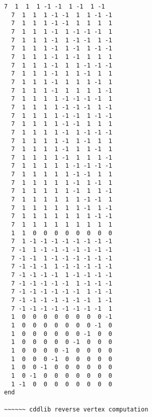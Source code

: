 \documentclass[%
  twocolumn,
 showpacs,
 showkeys,
 preprintnumbers,
 amsmath,amssymb,
 aps,
  pra,
  longbibliography,
 floatfix,
 ]{revtex4-1}
\begin{document}
{\begin{lstlisting}[backgroundcolor=\color{yellow!10},framerule=0pt,breaklines=true, frame=tb]
  7  1  1  1 -1 -1  1 -1  1 -1
  7  1  1  1 -1 -1  1  1 -1 -1
  7  1  1  1 -1 -1  1  1  1  1
  7  1  1  1 -1  1 -1 -1 -1  1
  7  1  1  1 -1  1 -1 -1  1 -1
  7  1  1  1 -1  1 -1  1 -1 -1
  7  1  1  1 -1  1 -1  1  1  1
  7  1  1  1 -1  1  1 -1 -1 -1
  7  1  1  1 -1  1  1 -1  1  1
  7  1  1  1 -1  1  1  1 -1  1
  7  1  1  1 -1  1  1  1  1 -1
  7  1  1  1  1 -1 -1 -1 -1  1
  7  1  1  1  1 -1 -1 -1  1 -1
  7  1  1  1  1 -1 -1  1 -1 -1
  7  1  1  1  1 -1 -1  1  1  1
  7  1  1  1  1 -1  1 -1 -1 -1
  7  1  1  1  1 -1  1 -1  1  1
  7  1  1  1  1 -1  1  1 -1  1
  7  1  1  1  1 -1  1  1  1 -1
  7  1  1  1  1  1 -1 -1 -1 -1
  7  1  1  1  1  1 -1 -1  1  1
  7  1  1  1  1  1 -1  1 -1  1
  7  1  1  1  1  1 -1  1  1 -1
  7  1  1  1  1  1  1 -1 -1  1
  7  1  1  1  1  1  1 -1  1 -1
  7  1  1  1  1  1  1  1 -1 -1
  7  1  1  1  1  1  1  1  1  1
  1  1  0  0  0  0  0  0  0  0
  7  1 -1 -1 -1 -1 -1 -1 -1 -1
  7 -1  1 -1 -1 -1 -1 -1 -1 -1
  7 -1 -1  1 -1 -1 -1 -1 -1 -1
  7 -1 -1 -1  1 -1 -1 -1 -1 -1
  7 -1 -1 -1 -1  1 -1 -1 -1 -1
  7 -1 -1 -1 -1 -1  1 -1 -1 -1
  7 -1 -1 -1 -1 -1 -1  1 -1 -1
  7 -1 -1 -1 -1 -1 -1 -1  1 -1
  7 -1 -1 -1 -1 -1 -1 -1 -1  1
  1  0  0  0  0  0  0  0  0 -1
  1  0  0  0  0  0  0  0 -1  0
  1  0  0  0  0  0  0 -1  0  0
  1  0  0  0  0  0 -1  0  0  0
  1  0  0  0  0 -1  0  0  0  0
  1  0  0  0 -1  0  0  0  0  0
  1  0  0 -1  0  0  0  0  0  0
  1  0 -1  0  0  0  0  0  0  0
  1 -1  0  0  0  0  0  0  0  0
end

~~~~~~ cddlib reverse vertex computation



\end{lstlisting}}
\end{document}
